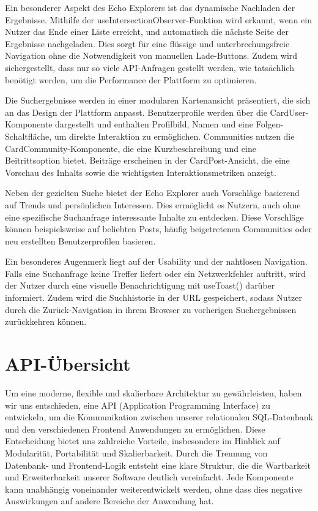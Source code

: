 \documentclass[a4paper,12pt]{article}
\begin{document}
Ein besonderer Aspekt des Echo Explorers ist das dynamische Nachladen der
Ergebnisse. Mithilfe der useIntersectionObserver-Funktion wird erkannt, wenn
ein Nutzer das Ende einer Liste erreicht, und automatisch die nächste Seite der
Ergebnisse nachgeladen. Dies sorgt für eine flüssige und unterbrechungsfreie
Navigation ohne die Notwendigkeit von manuellen Lade-Buttons. Zudem wird
sichergestellt, dass nur so viele API-Anfragen gestellt werden, wie tatsächlich
benötigt werden, um die Performance der Plattform zu optimieren.

Die Suchergebnisse werden in einer modularen Kartenansicht präsentiert, die
sich an das Design der Plattform anpasst. Benutzerprofile werden über die
CardUser-Komponente dargestellt und enthalten Profilbild, Namen und eine
Folgen-Schaltfläche, um direkte Interaktion zu ermöglichen. Communities nutzen
die CardCommunity-Komponente, die eine Kurzbeschreibung und eine
Beitrittsoption bietet. Beiträge erscheinen in der CardPost-Ansicht, die eine
Vorschau des Inhalts sowie die wichtigsten Interaktionsmetriken anzeigt.

Neben der gezielten Suche bietet der Echo Explorer auch Vorschläge basierend
auf Trends und persönlichen Interessen. Dies ermöglicht es Nutzern, auch ohne
eine spezifische Suchanfrage interessante Inhalte zu entdecken. Diese
Vorschläge können beispielsweise auf beliebten Posts, häufig beigetretenen
Communities oder neu erstellten Benutzerprofilen basieren.

Ein besonderes Augenmerk liegt auf der Usability und der nahtlosen Navigation.
Falls eine Suchanfrage keine Treffer liefert oder ein Netzwerkfehler auftritt,
wird der Nutzer durch eine visuelle Benachrichtigung mit useToast() darüber
informiert. Zudem wird die Suchhistorie in der URL gespeichert, sodass Nutzer
durch die Zurück-Navigation in ihrem Browser zu vorherigen Suchergebnissen
zurückkehren können.

\newpage
\section{API-Übersicht}

Um eine moderne, flexible und skalierbare Architektur zu gewährleisten, haben
wir uns entschieden, eine API (Application Programming Interface) zu
entwickeln, um die Kommunikation zwischen unserer relationalen SQL-Datenbank
und den verschiedenen Frontend Anwendungen zu ermöglichen. Diese Entscheidung
bietet uns zahlreiche Vorteile, insbesondere im Hinblick auf Modularität,
Portabilität und Skalierbarkeit. Durch die Trennung von Datenbank- und
Frontend-Logik entsteht eine klare Struktur, die die Wartbarkeit und
Erweiterbarkeit unserer Software deutlich vereinfacht. Jede Komponente kann
unabhängig voneinander weiterentwickelt werden, ohne dass dies negative
Auswirkungen auf andere Bereiche der Anwendung hat.
\end{document}
